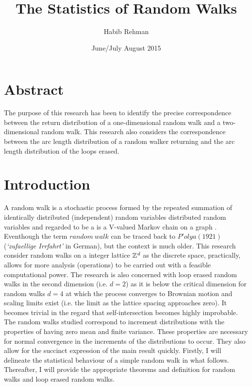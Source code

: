 \documentclass{article}
\title{The Statistics of Random Walks}
\author{Habib Rehman}
\date{June/July August 2015}
\begin{document}
\maketitle

 \section*{Abstract}
The purpose of this research has been to identify the precise correspondence between the return distribution of a one-dimensional random walk and a two-dimensional random walk. This research also considers the correspondence between the arc length distribution of a random walker returning and the arc length distribution of the loops erased.
 
\tableofcontents
\newpage


\section{Introduction}
	A random walk is a stochastic process formed by the repeated summation of identically distributed (independent) random variables distributed random variables and regarded to be a is a V-valued Markov chain on a graph \cite{schweinsberg2009loop}. Eventhough the term $random\ walk$ can be traced back to $P'olya \left( 1921 \right)$ (\emph{‘zufaellige Irrfahrt’} in German), but the context is much older. This research consider random walks on a integer lattice $\mathbb{Z}^\emph{{d}}$ as the discrete space, practically, allows for more analysis (operations) to be carried out with a feasible computational power. The research is also concerned with loop erased random walks in the second dimension (i.e. $d=2$) as it is below the critical dimension for random walks  $d = 4$ at which the process converges to Brownian motion \cite{lawler2010} and scaling limits exist (i.e. the limit as the lattice spacing approaches zero). It becomes trivial in the regard that self-intersection becomes highly improbable. The random walks studied correspond to increment distributions with the properties of having zero mean and finite variance. These properties are necessary for normal convergence in the increments of the distributions to occur. They also allow for the succinct expression of the main result quickly. Firstly, I will delineate the statistical behaviour of a simple random walk in what follows. Thereafter, I will provide the appropriate theorems and definition for random walks and loop erased random walks.
\end{document}
